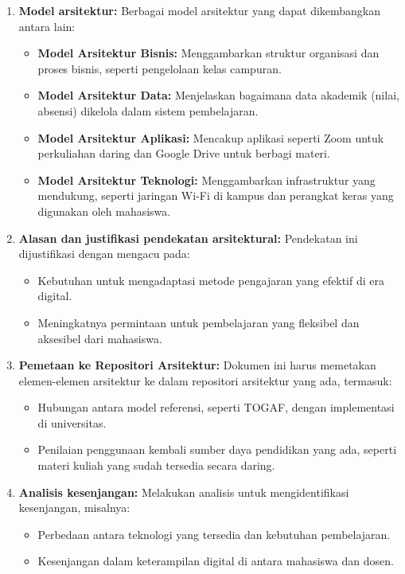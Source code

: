 \begin{enumerate}
	
	\item \textbf{Model arsitektur:}  
	Berbagai model arsitektur yang dapat dikembangkan antara lain:
	\begin{itemize}
		\item \textbf{Model Arsitektur Bisnis:} Menggambarkan struktur organisasi dan proses bisnis, seperti pengelolaan kelas campuran.
		\item \textbf{Model Arsitektur Data:} Menjelaskan bagaimana data akademik (nilai, absensi) dikelola dalam sistem pembelajaran.
		\item \textbf{Model Arsitektur Aplikasi:} Mencakup aplikasi seperti Zoom untuk perkuliahan daring dan Google Drive untuk berbagi materi.
		\item \textbf{Model Arsitektur Teknologi:} Menggambarkan infrastruktur yang mendukung, seperti jaringan Wi-Fi di kampus dan perangkat keras yang digunakan oleh mahasiswa.
	\end{itemize}
	
	\item \textbf{Alasan dan justifikasi pendekatan arsitektural:}  
	Pendekatan ini dijustifikasi dengan mengacu pada:
	\begin{itemize}
		\item Kebutuhan untuk mengadaptasi metode pengajaran yang efektif di era digital.
		\item Meningkatnya permintaan untuk pembelajaran yang fleksibel dan aksesibel dari mahasiswa.
	\end{itemize}
	
	\item \textbf{Pemetaan ke Repositori Arsitektur:}  
	Dokumen ini harus memetakan elemen-elemen arsitektur ke dalam repositori arsitektur yang ada, termasuk:
	\begin{itemize}
		\item Hubungan antara model referensi, seperti TOGAF, dengan implementasi di universitas.
		\item Penilaian penggunaan kembali sumber daya pendidikan yang ada, seperti materi kuliah yang sudah tersedia secara daring.
	\end{itemize}
	
	\item \textbf{Analisis kesenjangan:}  
	Melakukan analisis untuk mengidentifikasi kesenjangan, misalnya:
	\begin{itemize}
		\item Perbedaan antara teknologi yang tersedia dan kebutuhan pembelajaran.
		\item Kesenjangan dalam keterampilan digital di antara mahasiswa dan dosen.
	\end{itemize}
	

\end{enumerate}
